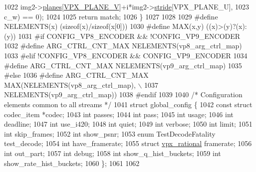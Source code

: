 \begin{DoxyCodeInclude}
{{{{{{{{{{{{{{{{{{{{{{{{{{{1022                      img2->\hyperlink{structvpx__image_ab6258308ba7a5f4a113348120e20e2ce}{planes}[\hyperlink{vpx__image_8h_aca9436ec761457cc6d2e356e0ac2fd23}{VPX\_PLANE\_V}]+i*img2->\hyperlink{structvpx__image_ac9c7b83e3eea44cb680956f90dc789cf}{stride}[VPX\_PLANE\_U],
1023                      c\_w) == 0);
1024 
1025   \textcolor{keywordflow}{return} match;
1026 \}
1027 
1028 
1029 \textcolor{preprocessor}{#define NELEMENTS(x) (sizeof(x)/sizeof(x[0]))}
1030 \textcolor{preprocessor}{#define MAX(x,y) ((x)>(y)?(x):(y))}
1031 \textcolor{preprocessor}{#if CONFIG\_VP8\_ENCODER && !CONFIG\_VP9\_ENCODER}
1032 \textcolor{preprocessor}{#define ARG\_CTRL\_CNT\_MAX NELEMENTS(vp8\_arg\_ctrl\_map)}
1033 \textcolor{preprocessor}{#elif !CONFIG\_VP8\_ENCODER && CONFIG\_VP9\_ENCODER}
1034 \textcolor{preprocessor}{#define ARG\_CTRL\_CNT\_MAX NELEMENTS(vp9\_arg\_ctrl\_map)}
1035 \textcolor{preprocessor}{#else}
1036 \textcolor{preprocessor}{#define ARG\_CTRL\_CNT\_MAX MAX(NELEMENTS(vp8\_arg\_ctrl\_map), \(\backslash\)}
1037 \textcolor{preprocessor}{                             NELEMENTS(vp9\_arg\_ctrl\_map))}
1038 \textcolor{preprocessor}{#endif}
1039 
1040 \textcolor{comment}{/* Configuration elements common to all streams */}
1041 \textcolor{keyword}{struct }global\_config \{
1042   \textcolor{keyword}{const} \textcolor{keyword}{struct }codec\_item  *codec;
1043   \textcolor{keywordtype}{int}                       passes;
1044   \textcolor{keywordtype}{int}                       pass;
1045   \textcolor{keywordtype}{int}                       usage;
1046   \textcolor{keywordtype}{int}                       deadline;
1047   \textcolor{keywordtype}{int}                       use\_i420;
1048   \textcolor{keywordtype}{int}                       quiet;
1049   \textcolor{keywordtype}{int}                       verbose;
1050   \textcolor{keywordtype}{int}                       limit;
1051   \textcolor{keywordtype}{int}                       skip\_frames;
1052   \textcolor{keywordtype}{int}                       show\_psnr;
1053   \textcolor{keyword}{enum} TestDecodeFatality   test\_decode;
1054   \textcolor{keywordtype}{int}                       have\_framerate;
1055   \textcolor{keyword}{struct }\hyperlink{structvpx__rational}{vpx\_rational}       framerate;
1056   \textcolor{keywordtype}{int}                       out\_part;
1057   \textcolor{keywordtype}{int}                       debug;
1058   \textcolor{keywordtype}{int}                       show\_q\_hist\_buckets;
1059   \textcolor{keywordtype}{int}                       show\_rate\_hist\_buckets;
1060 \};
1061 
1062 
}}}}}}}}}}}}}}}}}}}}}}}}}}}
\end{DoxyCodeInclude}
